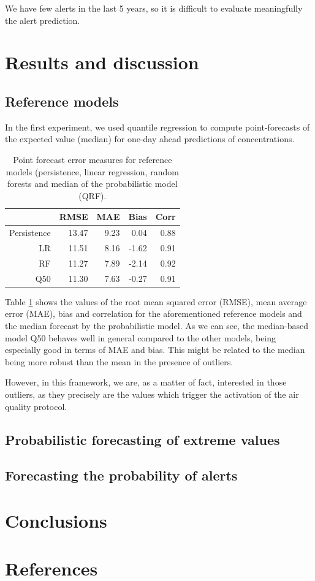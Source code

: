 \documentclass[a4paper,twocolumn,5p]{elsarticle}
\begin{document}
We have few alerts in the last 5 years, so it is difficult to evaluate meaningfully the alert prediction.

\section{Results and discussion}
\label{sec:results}




\subsection{Reference models}
\label{sec:deterministic}

In the first experiment, we used quantile regression to compute
point-forecasts of the expected value (median) for one-day ahead
predictions of \no concentrations.

\begin{table}[tbp]
\caption{\label{tab:determ}Point forecast error measures for reference
models (persistence, linear regression, random forests and median of
the probabilistic model (QRF).}
  \centering
\begin{tabular}{rrrrr}
  \toprule
 & RMSE & MAE & Bias & Corr \\ 
  \midrule
  Persistence & 13.47 & 9.23 & 0.04 & 0.88 \\ 
  LR   & 11.51 & 8.16 & -1.62 & 0.91 \\ 
  RF   & 11.27 & 7.89 & -2.14 & 0.92 \\
  Q50  & 11.30 & 7.63 & -0.27 & 0.91 \\ 
   \bottomrule
\end{tabular}
\end{table}

Table \ref{tab:determ} shows the values of the root mean squared error
(RMSE), mean average error (MAE), bias and correlation for the
aforementioned reference models and the median forecast by the
probabilistic model. As we can see, the median-based model Q50 behaves
well in general compared to the other models, being especially good in
terms of MAE and bias. This might be related to the median being more
robust than the mean in the presence of outliers.

However, in this framework, we are, as a matter of fact, interested in
those outliers, as they precisely are the values which trigger the
activation of the air quality protocol.


\subsection{Probabilistic forecasting of extreme values}
\label{sec:probabilistic}


\subsection{Forecasting the probability of alerts}
\label{sec:alertProb2}


\section{Conclusions}
\label{sec:concl}


\section*{References}


\end{document}

